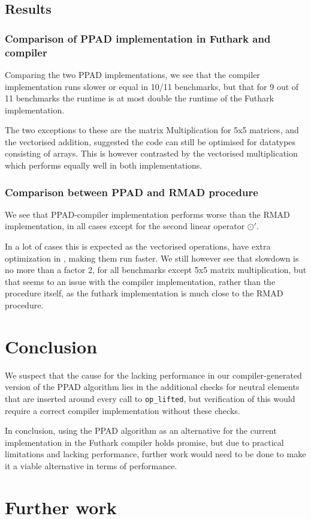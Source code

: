 \documentclass{article}
\begin{document}
\subsection{Results}
\subsubsection*{Comparison of PPAD implementation in Futhark and compiler}
Comparing the two PPAD implementations,
we see that the compiler implementation runs slower or equal in 10/11 benchmarks,
but that for 9 out of 11 benchmarks the runtime is at most double the
runtime of the Futhark implementation.

The two exceptions to these are the matrix Multiplication for 5x5 matrices,
and the vectorised addition,
suggested the code can still be optimised for datatypes consisting of
arrays.
This is however contrasted by the vectorised multiplication which performs
equally well in both implementations.

\subsubsection*{Comparison between PPAD and RMAD procedure}
We see that PPAD-compiler implementation performs worse than the RMAD
implementation, in all cases except for the second linear operator \(\odot'\).

In a lot of cases this is expected as the vectorised operations, have extra
optimization in \cite{Futhark}, making them run faster.
We still however see that slowdown is no more than a factor 2, for all
benchmarks except 5x5 matrix multiplication, but that seems to an issue with
the compiler implementation, rather than the procedure itself, as the
futhark implementation is much close to the RMAD procedure.
\section{Conclusion}
We suspect that the cause for the lacking performance in our compiler-generated version of the PPAD
algorithm lies in the additional checks for neutral elements that are inserted around
every call to \lstinline{op_lifted}, but verification of this would require a correct
compiler implementation without these checks.

In conclusion, using the PPAD algorithm as an alternative for the current implementation in the
Futhark compiler holds promise, but due to practical limitations and lacking performance, further
work would need to be done to make it a viable alternative in terms of performance.
\printbibliography
\section{Further work}
\end{document}
